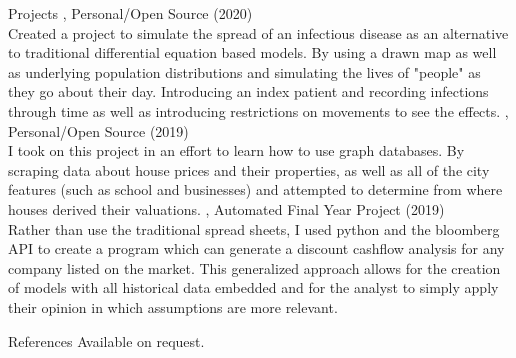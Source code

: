 \documentclass{resume}
\begin{document}

\begin{category}{Projects}
, Personal/Open Source (2020)\\
  Created a project to simulate the spread of an infectious disease as an alternative to traditional
  differential equation based models. By using a drawn map as well as underlying population distributions
  and simulating the lives of "people" as they go about their day. Introducing an index patient and
  recording infections through time as well as introducing restrictions on movements to see the effects.
, Personal/Open Source (2019)\\
  I took on this project in an effort to learn how to use graph databases. By scraping data about
  house prices and their properties, as well as all of the city features (such as school and businesses)
  and attempted to determine from where houses derived their valuations.
, Automated Final Year Project (2019)\\
  Rather than use the traditional spread sheets, I used python and the bloomberg API to create a 
  program which can generate a discount cashflow analysis for any company listed on the market. 
  This generalized approach allows for the creation of models with all historical data embedded and 
  for the analyst to simply apply their opinion in which assumptions are more relevant.
\end{category}


\begin{category}{References}
\citemnobullet Available on request.
\end{category}
\end{document}
